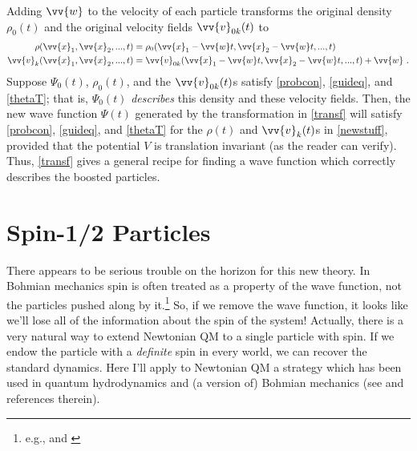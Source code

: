\documentclass[12pt,secnumarabic,balancelastpage,amsmath,amssymb,nofootinbib]{article}
\begin{document}
Adding $\vv{w}$ to the velocity of each particle transforms the original density $\rho_0(t)$ and the original velocity fields $\vv{v}_{0k}(t)$ to
\begin{align}
\rho(\vv{x}_1,\vv{x}_2,...,t) &= \rho_0(\vv{x}_1-\vv{w}t,\vv{x}_2-\vv{w}t,...,t)
\nonumber
\\
\vv{v}_{k}(\vv{x}_1,\vv{x}_2,...,t) &= \vv{v}_{0k}(\vv{x}_1-\vv{w}t,\vv{x}_2-\vv{w}t,...,t)+\vv{w}\ .
\label{newstuff}
\end{align}
Suppose $\Psi_0(t)$, $\rho_0(t)$, and the $\vv{v}_{0k}(t)$s satisfy \eqref{probcon}, \eqref{guideq}, and \eqref{thetaT}; that is, $\Psi_0(t)$ \emph{describes} this density and these velocity fields.  Then, the new wave function $\Psi(t)$ generated by the transformation in \eqref{transf} will satisfy \eqref{probcon}, \eqref{guideq}, and \eqref{thetaT} for the $\rho(t)$ and $\vv{v}_k(t)$s in \eqref{newstuff}, provided that the potential $V$ is translation invariant (as the reader can verify).  Thus, \eqref{transf} gives a general recipe for finding a wave function which correctly describes the boosted particles.

\section{Spin-1/2 Particles}\label{withspin}

There appears to be serious trouble on the horizon for this new theory.  In Bohmian mechanics spin is often treated as a property of the wave function, not the particles pushed along by it.\footnote{e.g., \citet[]{durr2009} and \citet[ch. 7]{albert1994}}  So, if we remove the wave function, it looks like we'll lose all of the information about the spin of the system!  Actually, there is a very natural way to extend Newtonian QM to a single particle with spin.  If we endow the particle with a \emph{definite} spin in every world, we can recover the standard dynamics.  Here I'll apply to Newtonian QM a strategy which has been used in quantum hydrodynamics and (a version of) Bohmian mechanics (see \citealp[][ch. 9]{holland} and references therein).
\end{document}
